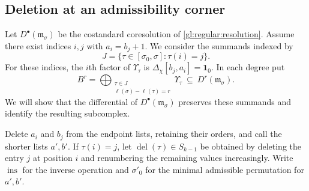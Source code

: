 \documentclass[10pt,a4paper]{article}
\newtheorem{lemma}[theorem]{Lemma}
\theoremstyle{definition}
\theoremstyle{remark}
\numberwithin{equation}{section}
\newcommand{\fm}{\mathfrak{m}}
\newcommand{\Lrep}{\mathrm{L}}
\newcommand{\one}{\mathbf{1}}
\newcommand{\De}{\Delta}
\begin{document}
\subsection{Deletion at an admissibility corner}

Let $D^\bullet(\fm_\sigma)$ be the costandard coresolution of
\cref{gl:regular:resolution}. Assume there exist indices $i,j$ with $a_i=b_j+1$.
We consider the summands indexed by
\[
 J=\{\tau\in[\sigma_0,\sigma]:\tau(i)=j\}.
\]
For these indices, the $i$th factor of $\Upsilon_\tau$ is
$\De_\chi[b_j,a_i]=\one_0$. In each degree put
\[
 B^r=\bigoplus_{\substack{\tau\in J\\
                         \ell(\sigma)-\ell(\tau)=r}}\Upsilon_\tau
 \ \subseteq\ D^r(\fm_\sigma).
\]
We will show that the differential of $D^\bullet(\fm_\sigma)$
preserves these summands and identify the resulting subcomplex.

Delete $a_i$ and $b_j$ from the endpoint lists, retaining their
orders, and call the shorter lists $a',b'$. If $\tau(i)=j$, let
$\operatorname{del}(\tau)\in S_{k-1}$ be obtained by deleting the
entry $j$ at position $i$ and renumbering the remaining values
increasingly. Write $\operatorname{ins}$ for the inverse operation
and $\sigma'_0$ for the minimal admissible permutation for $a',b'$.

\end{document}

